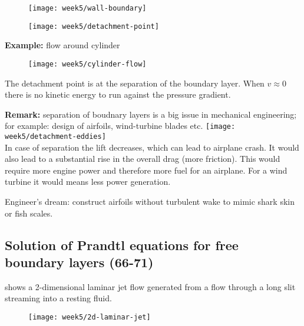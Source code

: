 \begin{figure}[!h]
    \centering
    \texttt{[image: week5/wall-boundary]}\\
    \caption{}
    \label{fig:wall-boundary}
\end{figure}

\begin{figure}[!h]
    \centering
    \texttt{[image: week5/detachment-point]}\\
    \caption{}
    \label{fig:detachment-point}
\end{figure}

\newpage
\textbf{Example:} flow around cylinder

\begin{figure}[!h]
    \centering
    \texttt{[image: week5/cylinder-flow]}\\
    \caption{}
    \label{fig:cylinder-flow}
\end{figure}

The detachment point is at the separation of the boundary layer. When $v\approx0$ there is no kinetic energy to run against the pressure gradient.

\begin{framed}
\textbf{Remark:} separation of boudnary layers is a big issue in mechanical engineering; for example: design of airfoils, wind-turbine blades etc.
{\center
\texttt{[image: week5/detachment-eddies]}\\
}
In case of separation the lift decreases, which can lead to airplane crash. It would also lead to a substantial rise in the overall drag (more friction). This would require more engine power and therefore more fuel for an airplane. For a wind turbine it would means less power generation.

Engineer's dream: construct airfoils without turbulent wake to mimic shark skin or fish scales.
\end{framed}

\subsection{Solution of Prandtl equations for free boundary layers (66-71)}

 shows a 2-dimensional laminar jet flow generated from a flow through a long slit streaming into a resting fluid.

\begin{figure}[!h]
    \centering
    \texttt{[image: week5/2d-laminar-jet]}\\
    \caption{}
    \label{fig:2d-laminar-jet}
\end{figure}

